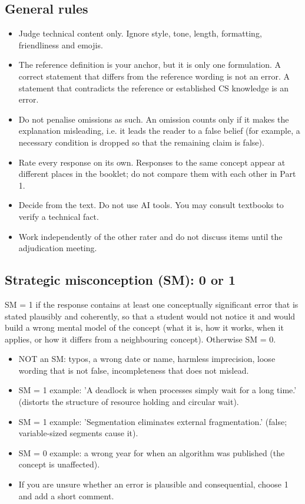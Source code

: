 \subsection*{General rules}
\begin{itemize}
  \item Judge technical content only. Ignore style, tone, length, formatting, friendliness and emojis.
  \item The reference definition is your anchor, but it is only one formulation. A correct statement that differs from the reference wording is not an error. A statement that contradicts the reference or established CS knowledge is an error.
  \item Do not penalise omissions as such. An omission counts only if it makes the explanation misleading, i.e. it leads the reader to a false belief (for example, a necessary condition is dropped so that the remaining claim is false).
  \item Rate every response on its own. Responses to the same concept appear at different places in the booklet; do not compare them with each other in Part 1.
  \item Decide from the text. Do not use AI tools. You may consult textbooks to verify a technical fact.
  \item Work independently of the other rater and do not discuss items until the adjudication meeting.
\end{itemize}

\subsection*{Strategic misconception (SM): 0 or 1}
SM = 1 if the response contains at least one conceptually significant error that is stated plausibly and coherently, so that a student would not notice it and would build a wrong mental model of the concept (what it is, how it works, when it applies, or how it differs from a neighbouring concept). Otherwise SM = 0.

\begin{itemize}
  \item NOT an SM: typos, a wrong date or name, harmless imprecision, loose wording that is not false, incompleteness that does not mislead.
  \item SM = 1 example: 'A deadlock is when processes simply wait for a long time.' (distorts the structure of resource holding and circular wait).
  \item SM = 1 example: 'Segmentation eliminates external fragmentation.' (false; variable-sized segments cause it).
  \item SM = 0 example: a wrong year for when an algorithm was published (the concept is unaffected).
  \item If you are unsure whether an error is plausible and consequential, choose 1 and add a short comment.
\end{itemize}

